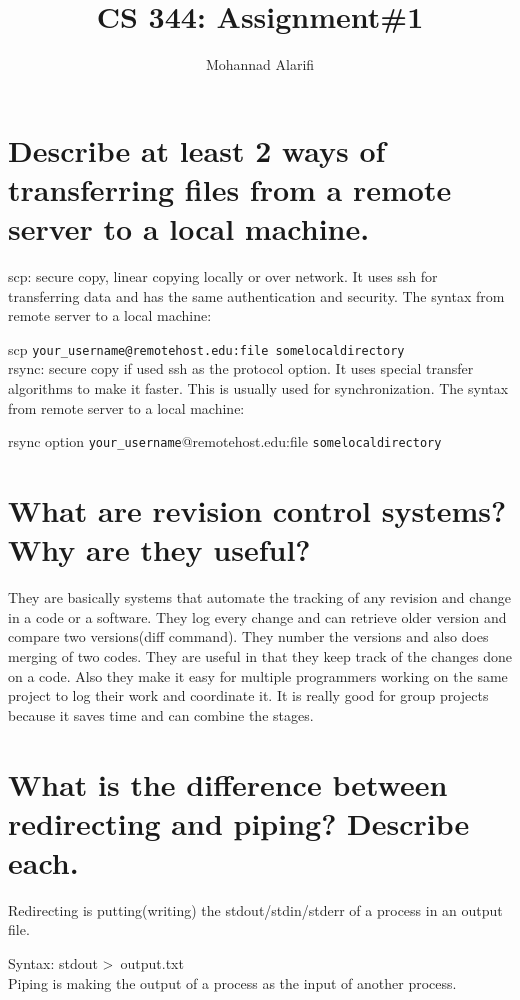 \documentclass[a4paper]{article}
\title{CS 344: Assignment\#1}
\author{Mohannad Alarifi}
\begin{document}
\maketitle


\section{Describe at least 2 ways of transferring files from a remote server to a local machine.}

scp: secure copy, linear copying locally or over network. It uses ssh for transferring data and has the same authentication and security. The syntax from remote server to a local machine:


scp \texttt{your\_username@remotehost.edu:file  \/some\/local\/directory}
\\
rsync: secure copy if used ssh as the protocol option. It uses special transfer algorithms to make it faster. This is usually used for synchronization. The syntax from remote server to a local machine:


rsync option \texttt{your\_username}@remotehost.edu:file \texttt{\/some\/local\/directory }


\section{What are revision control systems? Why are they useful?}


 They are basically systems that automate the tracking of any revision and change in a code or a software. They log every change and can retrieve older version and compare two versions(diff command). They number the versions and also does merging of two codes. They are useful in that they keep track of the changes done on a code. Also they make it easy for multiple programmers working on the same project to log their work and coordinate it. It is really good for group projects because it saves time and can combine the stages.

\section{What is the difference between redirecting and piping? Describe each.}

Redirecting is putting(writing) the stdout/stdin/stderr of a process in an output file.

Syntax: stdout \textgreater \ output.txt\\  
Piping is making the output of a process as the input of another process.
		
\end{document}

